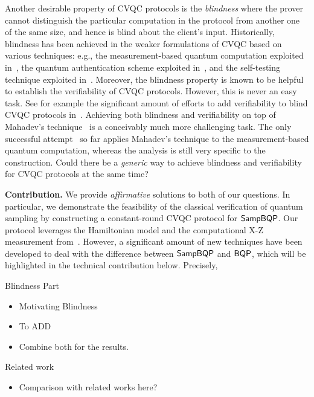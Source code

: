 Another desirable property of CVQC protocols is the \emph{blindness} where the prover cannot distinguish the particular computation in the protocol from another one of the same size, and hence is blind about the client's input. 
Historically, blindness has been achieved in the weaker formulations of CVQC based on various techniques: e.g., the measurement-based quantum computation exploited in~\cite{BFK09}, the quantum authentication scheme exploited in~\cite{arXiv:ABOEM17}, and the self-testing technique exploited in~\cite{Nat:RUV13}. 
Moreover, the blindness property is known to be helpful to establish the verifiability of CVQC protocols. However, this is never an easy task. 
See for example the significant amount of efforts to add verifiability to blind CVQC protocols in~\cite{FK17}. 
Achieving both blindness and verifiability on top of Mahadev's technique~\cite{FOCS:Mahadev18a} is a conceivably much more challenging task. 
The only successful attempt~\cite{FOCS:GheVid19} so far applies Mahadev's technique to the measurement-based quantum computation, 
whereas the analysis is still very specific to the construction. 
Could there be a \emph{generic} way to achieve blindness and verifiability for CVQC protocols at the same time?


\vspace{2mm} \noindent \textbf{Contribution.} We provide \emph{affirmative} solutions to both of our questions. 
In particular, we demonstrate the feasibility of the classical verification of quantum sampling by 
constructing a constant-round CVQC protocol for $\operatorname{\mathsf{SampBQP}}$. 
Our protocol leverages the Hamiltonian model and the computational X-Z measurement from~\cite{FOCS:Mahadev18a}.
However, a significant amount of new techniques have been developed to deal with the difference between $\operatorname{\mathsf{SampBQP}}$ and $\operatorname{\mathsf{BQP}}$, which will be highlighted in the technical contribution below. Precisely, 


Blindness Part 
\begin{itemize}
    \item Motivating Blindness
    \item To ADD
    \item Combine both for the results. 
\end{itemize}

Related work
\begin{itemize}
    \item Comparison with related works here?
\end{itemize}

